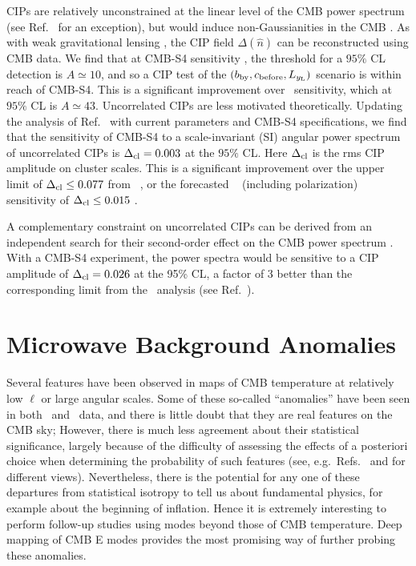 CIPs are relatively unconstrained at the linear level of the CMB power spectrum (see Ref.~\cite{Munoz:2015fdv} for an exception), but would induce non-Gaussianities in the CMB \cite{Grin:2011nk,Grin:2011tf,Grin:2013uya,He:2015msa}. As with weak gravitational lensing \cite{Hu:2001kj}, the CIP field $\Delta(\hat{n})$ can be reconstructed using CMB data. We find that at CMB-S4 sensitivity \cite{He:2015msa}, the threshold for a $95\%$ CL detection is $A\simeq 10$, and so a CIP test of the $(b_{\rm by}, c_{\rm before}, L_{ y_{\rm L}})$ scenario is within reach of CMB-S4. This is a significant improvement over \planck\ sensitivity, which at $95\%$ CL is $A\simeq 43$. Uncorrelated CIPs are less  motivated theoretically. Updating the analysis of Ref.~\cite{He:2015msa} with current parameters \cite{Ade:2015lrj} and CMB-S4 specifications, we find that the sensitivity of CMB-S4 to a scale-invariant (SI) angular power spectrum of uncorrelated CIPs is $\Delta_{\rm cl}=0.003$ at the $95\%$ CL. Here $\Delta_{\rm cl}$ is the rms CIP amplitude on cluster scales. This is a significant improvement over the upper limit of $\Delta_{\rm cl}\leq 0.077$ from \wmap\ \cite{Grin:2013uya}, or the forecasted \planck\ \cite{Ade:2015lrj} (including polarization) sensitivity of $\Delta_{\rm cl}\leq 0.015$ \cite{He:2015msa}. 

A complementary constraint on uncorrelated CIPs can be derived from an independent search for their second-order effect on the CMB power spectrum \cite{Munoz:2015fdv}. With a CMB-S4 experiment, the power spectra would be sensitive to a CIP amplitude of $\Delta_{\rm cl} = 0.026$ at the 95\% CL, a factor of 3 better than the corresponding limit from the \planck\ analysis (see Ref.~\cite{Munoz:2015fdv}). 


\section{Microwave Background Anomalies}

Several features have been observed in maps of CMB temperature at
relatively low $\ell$ or large angular scales.  Some of these
so-called ``anomalies'' have been seen in both \wmap\ and \planck\
data, and there is little doubt that they are real features on the CMB sky;
However, there is much less agreement about their statistical significance,
largely because of the difficulty of assessing the effects of a posteriori
choice when determining the probability of such features
(see, e.g.\ Refs.~\cite{Bennett:2010jb,Ade:2015hxq} and \cite{Schwarz:2015cma} for
different views).  Nevertheless, there is
the potential for any one of these departures from statistical isotropy to
tell us about fundamental physics, for example about the beginning of inflation.
Hence it is extremely interesting to perform follow-up studies using modes
beyond those of CMB temperature.  Deep mapping of CMB E modes provides the most
promising way of further probing these anomalies.

